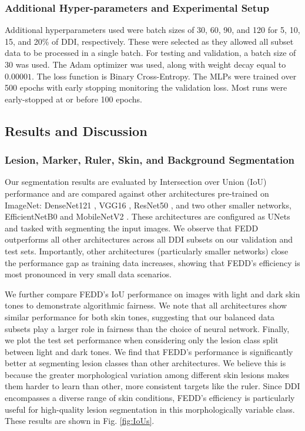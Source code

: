 \documentclass[11pt]{ucthesis}
\begin{document}
\subsubsection{Additional Hyper-parameters and Experimental Setup}
Additional hyperparameters used were batch sizes of 30, 60, 90, and 120 for 5, 10, 15, and 20\% of DDI, respectively. These were selected as they allowed all subset data to be processed in a single batch. For testing and validation, a batch size of 30 was used. The Adam optimizer was used, along with weight decay equal to $0.00001$. The loss function is Binary Cross-Entropy. The MLPs were trained over 500 epochs with early stopping monitoring the validation loss. Most runs were early-stopped at or before 100 epochs.

\subsection{Results and Discussion}
\label{sec:fedd_results}
\subsubsection{Lesion, Marker, Ruler, Skin, and Background Segmentation}
Our segmentation results are evaluated by Intersection over Union (IoU) performance and are compared against other architectures pre-trained on ImageNet: DenseNet121 \cite{huang_2016_densely}, VGG16 \cite{simonyan_2014_very}, ResNet50 \cite{he_2015_deep}, and two other smaller networks, EfficientNetB0 \cite{tan_2019_efficientnet} and MobileNetV2 \cite{sandler_2018_mobilenetv2}. These architectures are configured as UNets and tasked with segmenting the input images. We observe that FEDD outperforms all other architectures across all DDI subsets on our validation and test sets. Importantly, other architectures (particularly smaller networks) close the performance gap as training data increases, showing that FEDD's efficiency is most pronounced in very small data scenarios.

We further compare FEDD's IoU performance on images with light and dark skin tones to demonstrate algorithmic fairness. We note that all architectures show similar performance for both skin tones, suggesting that our balanced data subsets play a larger role in fairness than the choice of neural network. Finally, we plot the test set performance when considering only the lesion class split between light and dark tones. We find that FEDD's performance is significantly better at segmenting lesion classes than other architectures. We believe this is because the greater morphological variation among different skin lesions makes them harder to learn than other, more consistent targets like the ruler. Since DDI encompasses a diverse range of skin conditions, FEDD's efficiency is particularly useful for high-quality lesion segmentation in this morphologically variable class. These results are shown in Fig. \ref{fig:IoUs}.
\end{document}
